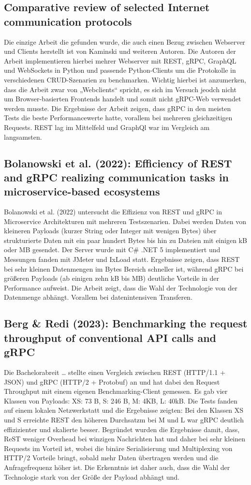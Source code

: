 \subsection{Comparative review of selected Internet communication protocols}
Die einzige Arbeit die gefunden wurde, die auch einen Bezug zwischen Webserver und Clients herstellt ist von Kaminski und weiteren Autoren. Die Autoren der Arbeit implementieren hierbei mehrer Webserver mit REST, gRPC, GraphQL und WebSockets in Python und passende Python-Clients um die Protokolle in verschiedenen CRUD-Szenarien zu benchmarken. Wichtig hierbei ist anzumerken, dass die Arbeit zwar von „Webclients“ spricht, es sich  im Versuch jeodch nicht um Browser-basierten Frontends handelt und somit nicht gRPC-Web verwendet werden musste. Die Ergebnisse der Arbeit zeigen, dass gRPC in den meisten Tests die beste Performancewerte hatte, vorallem bei mehreren gleichzeitigen Requests. REST lag im Mittelfeld und GraphQl war im Vergleich am langsamsten. 

\subsection{Bolanowski et al. (2022): Efficiency of REST and gRPC realizing communication tasks in microservice-based ecosystems}
Bolanowski et al. (2022) untersucht die Effizienz von REST und gRPC in Microservice Architekturen mit mehreren Testszenarien. Dabei werden Daten von kleineren Payloads (kurzer String oder Integer mit wenigen Bytes) über strukturierte Daten mit ein paar hundert Bytes bis hin zu Dateien mit einigen kB oder MB gesendet. Der Server wurde mit C\# .NET 5 implementiert und Messungen fanden mit JMeter und IxLoad statt.
Ergebnisse zeigen, dass REST bei sehr kleinen Datenmengen im Bytes Bereich schneller ist, während gRPC bei größeren Payloads (ab einigen zehn kB bis MB) deutliche Vorteile in der Performance aufweist. Die Arbeit zeigt, dass die Wahl der Technologie von der Datenmenge abhängt. Vorallem bei datenintensiven Transferen.

\subsection{Berg \& Redi (2023): Benchmarking the request throughput of conventional API calls and gRPC}
Die Bachelorabreit … stellte einen Vergleich zwischen REST (HTTP/1.1 + JSON) und gRPC (HTTP/2 + Protobuf) an und hat dabei den Request Throughput mit einem eigenen Benchmarking-Client gemessen. Es gab vier Klassen von Payloads:
XS: 73 B, S: 246 B, M: 4KB, L: 40kB.
Die Tests fanden auf einem lokalen Netzwerkstatt und die Ergebnisse zeigten: 
Bei den Klassen XS und S erreichte REST den höheren Durchsatzm bei M und L war gRPC deutlich effizizienter und skalierte besser. Begründet wurden die Ergebnisse damit, dass,  ReST weniger Overhead bei winzigen Nachrichten hat und  daher bei sehr kleinen Requests im Vorteil ist, wobei die binäre Serialisierung und  Multiplexing von HTTP/2 Vorteile bringt, sobald mehr Daten übertragen werden und die Anfragefrequenz höher ist. Die Erkenntnis ist daher auch, dass die Wahl der Technologie stark von der Größe der Payload abhängt und.


